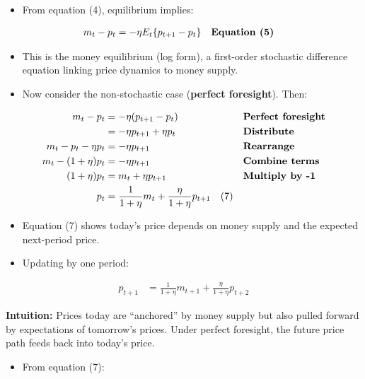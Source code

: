 \documentclass[12pt]{article}
\begin{document}
\begin{itemize}
    \item From equation (4), equilibrium implies:  
\end{itemize}

\singlespacing
\begin{align}
m_t - p_t &= -\eta E_t \{ p_{t+1} - p_t \} && \text{\textbf{Equation (5)}} 
\end{align}

\begin{itemize}
    \item This is the money equilibrium (log form), a first-order stochastic difference equation linking price dynamics to money supply.  
    \item Now consider the non-stochastic case (\textbf{perfect foresight}). Then:  
\end{itemize}

\singlespacing
\begin{align}
m_t - p_t &= -\eta (p_{t+1} - p_t) && \text{\textbf{Perfect foresight}} \\
          &= -\eta p_{t+1} + \eta p_t && \text{\textbf{Distribute}} \\
m_t - p_t - \eta p_t &= -\eta p_{t+1} && \text{\textbf{Rearrange}} \\
m_t - (1+\eta) p_t &= -\eta p_{t+1} && \text{\textbf{Combine terms}} \\
(1+\eta) p_t &= m_t + \eta p_{t+1} && \text{\textbf{Multiply by -1}} \\
p_t &= \frac{1}{1+\eta} m_t + \frac{\eta}{1+\eta} p_{t+1} \quad (7)
\end{align}

\begin{itemize}
    \item Equation (7) shows today’s price depends on money supply and the expected next-period price.  
    \item Updating by one period:  
\end{itemize}

\singlespacing
\begin{align}
p_{t+1} &= \frac{1}{1+\eta} m_{t+1} + \frac{\eta}{1+\eta} p_{t+2} 
\end{align}

\textbf{Intuition:} Prices today are “anchored” by money supply but also pulled forward by expectations of tomorrow’s prices. Under perfect foresight, the future price path feeds back into today’s price.

\begin{itemize}
    \item From equation (7):  
\end{itemize}
\end{document}

